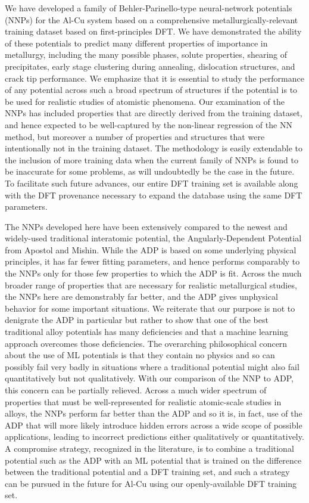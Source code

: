 \documentclass{article}
\begin{document}
We have developed a family of Behler-Parinello-type neural-network potentials (NNPs) for the Al-Cu system based on a comprehensive metallurgically-relevant training dataset based on first-principles DFT.  We have demonstrated the ability of these potentials to predict many different properties of importance in metallurgy, including the many possible phases, solute properties, shearing of precipitates, early stage clustering during annealing, dislocation structures, and crack tip performance.  We emphasize that it is essential to study the performance of any potential across such a broad spectrum of structures if the potential is to be used for realistic studies of atomistic phenomena.  Our examination of the NNPs has included properties that are directly derived from the training dataset, and hence expected to be well-captured by the non-linear regression of the NN method, but moreover a number of properties and structures that were intentionally not in the training dataset.  The methodology is easily extendable to the inclusion of more training data when the current family of NNPs is found to be inaccurate for some problems, as will undoubtedly be the case in the future.  To facilitate such future advances, our entire DFT training set is available along with the DFT provenance necessary to expand the database using the same DFT parameters.

The NNPs developed here have been extensively compared to the newest and widely-used traditional interatomic potential, the Angularly-Dependent Potential from Apostol and Mishin.  While the ADP is based on some underlying physical principles, it has far fewer fitting parameters, and hence performs comparably to the NNPs only for those few properties to which the ADP is fit.  Across the much broader range of properties that are necessary for realistic metallurgical studies, the NNPs here are demonstrably far better, and the ADP gives unphysical behavior for some important situations.  We reiterate that our purpose is not to denigrate the ADP in particular but rather to show that one of the best traditional alloy potentials has many deficiencies and that a machine learning approach overcomes those deficiencies.  The overarching philosophical concern about the use of ML potentials is that they contain no physics and so can possibly fail very badly in situations where a traditional potential might also fail quantitatively but not qualitatively.  With our comparison of the NNP to ADP, this concern can be partially relieved.  Across a much wider spectrum of properties that must be well-represented for realistic atomic-scale studies in alloys, the NNPs perform far better than the ADP and so it is, in fact, use of the ADP that will more likely introduce hidden errors across a wide scope of possible applications, leading to incorrect predictions either qualitatively or quantitatively.  A compromise strategy, recognized in the literature, is to combine a traditional potential such as the ADP with an ML potential that is trained on the difference between the traditional potential and a DFT training set, and such a strategy can be pursued in the future for Al-Cu using our openly-available DFT training set.
\end{document}
